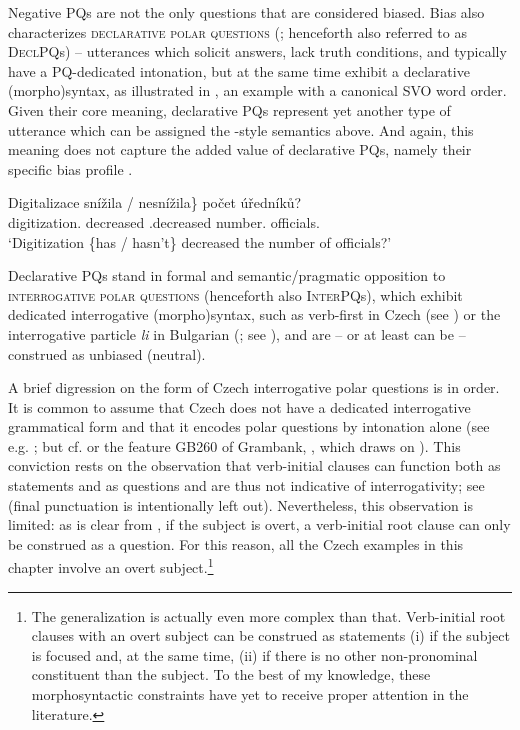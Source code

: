 \documentclass[output=paper,colorlinks,citecolor=brown]{langscibook}
\begin{document}
\noindent Negative PQs are not the only questions that are considered biased. Bias also characterizes \textsc{declarative polar questions} (\citealt{Gunlogson2002}; henceforth also referred to as \textsc{DeclPQ}s) -- utterances which solicit answers, lack truth conditions, and typically have a PQ-dedicated intonation, but at the same time exhibit a declarative (morpho)syntax, as illustrated in , an example with a canonical SVO word order. Given their core meaning, declarative PQs represent yet another type of utterance which can be assigned the \citeauthor{Hamblin1973}-style semantics above. And again, this meaning does not capture the added value of declarative PQs, namely their specific bias profile \citep{Gartner.Gyuris2017}.

\ea\gll Digitalizace \minsp{\{} snížila / nesnížila\} počet úředníků?\label{sim:ex:decl-pq}\\
digitization.{\NOM} {} decreased {} \NEG.decreased number.{\ACC} officials.{\GEN}\\
\glt `Digitization \{has / hasn't\} decreased the number of officials?'
\z

\noindent Declarative PQs stand in formal and semantic/pragmatic opposition to \textsc{interrogative polar questions} (henceforth also \textsc{InterPQ}s), which exhibit dedicated interrogative (morpho)\-syntax, such as verb-first in Czech (see ) or the interrogative particle \textit{li} in Bulgarian (\citealt{Rivero1993,Rudin.etal1999}; see ), and are -- or at least can be -- construed as unbiased (neutral).

A brief digression on the form of Czech interrogative polar questions is in order. It is common to assume that Czech does not have a dedicated interrogative grammatical form and that it encodes polar questions by intonation alone (see e.g. \citealt{Veronkova2002}; but cf. \citealt{Stankova2023} or the feature GB260 of Grambank, \citealt{Skirgard.etal2023}, which draws on \citealt{Naughton2005}). This conviction rests on the observation that verb-initial clauses can function both as statements and as questions and are thus not indicative of interrogativity; see  (final punctuation is intentionally left out). Nevertheless, this observation is limited: as is clear from , if the subject is overt, a verb-initial root clause can only be construed as a question. For this reason, all the Czech examples in this chapter involve an overt subject.\footnote{The generalization is actually even more complex than that. Verb-initial root clauses with an overt subject can be construed as statements (i) if the subject is focused and, at the same time, (ii) if there is no other non-pronominal constituent than the subject. To the best of my knowledge, these morphosyntactic constraints have yet to receive proper attention in the literature.}
\end{document}
